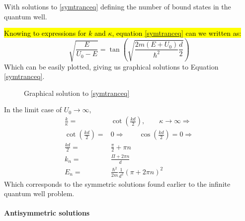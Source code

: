 				With solutions to \ref{symtranceq} defining the number of bound states in the quantum well. 
				
				\hl{Knowing to expressions for $k$ and $\kappa$, equation \ref{symtranceq} can we written as:}
				\begin{equation}
					\sqrt{\frac{E}{U_0-E}} = \tan\left(\sqrt{\frac{2m(E+U_0)}{\hbar^2}\frac{d}{2}}\right)
				\end{equation}
				Which can be easily plotted, giving us graphical solutions to Equation \ref{symtranceq}.
				\begin{figure}[!h]
					\centering
					
					\caption{Graphical solution to \ref{symtranceq}}
				\end{figure}
				
				In the limit case of $U_0 \rightarrow \infty$,
				\begin{align}
					\frac{k}{\kappa} =& \cot(\frac{kd}{2}),\qquad \kappa \rightarrow \infty \Rightarrow \\
					\cot(\frac{kd}{2}) =& 0 \Rightarrow\qquad	\cos(\frac{kd}{2}) = 0 \Rightarrow\\
					\frac{kd}{2} =& \frac{\pi}{2} + \pi n \\
					k_n =& \frac{\Pi + 2\pi n}{d} \\
					E_n =& \frac{\hbar^2}{2m}\frac{1}{d^2}\left(\pi + 2\pi n\right)^2
				\end{align}
				Which corresponds to the symmetric solutions found earlier to the infinite quantum well problem.
				
			\paragraph{Antisymmetric solutions}
				
